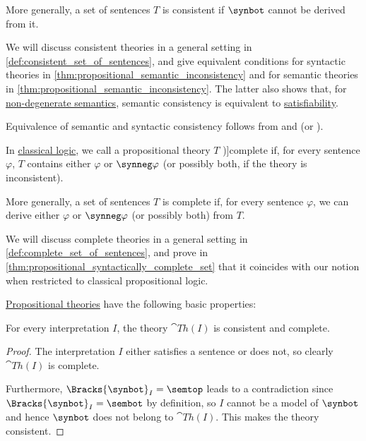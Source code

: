\begin{definition}
\begin{thmenum}
    More generally, a set of sentences \( T \) is consistent if \( \synbot \) cannot be derived from it.

    We will discuss consistent theories in a general setting in \cref{def:consistent_set_of_sentences}, and give equivalent conditions for syntactic theories in \cref{thm:propositional_semantic_inconsistency} and for semantic theories in \cref{thm:propositional_semantic_inconsistency}. The latter also shows that, for \hyperref[def:truth_value_algebra/degenerate]{non-degenerate semantics}, semantic consistency is equivalent to \hyperref[def:propositional_semantics/satisfaction]{satisfiability}.

    Equivalence of semantic and syntactic consistency follows from  and  (or ).

     In \hyperref[con:classical_logic]{classical logic}, we call a propositional theory \( T \) \term[ru=полное (множество формул) (\cite[def. 1.3.16]{Герасимов2014Вычислимость})]{complete} if, for every sentence \( \varphi \), \( T \) contains either \( \varphi \) or \( \synneg \varphi \) (or possibly both, if the theory is inconsistent).

    More generally, a set of sentences \( T \) is complete if, for every sentence \( \varphi \), we can derive either \( \varphi \) or \( \synneg \varphi \) (or possibly both) from \( T \).

    We will discuss complete theories in a general setting in \cref{def:complete_set_of_sentences}, and prove in \cref{thm:propositional_syntactically_complete_set} that it coincides with our notion when restricted to classical propositional logic.
  \end{thmenum}
\end{definition}

\begin{proposition}\label{thm:def:propositional_theory}
  \hyperref[def:propositional_theory]{Propositional theories} have the following basic properties:
  \begin{thmenum}
     For every interpretation \( I \), the theory \( \cat{Th}(I) \) is consistent and complete.
  \end{thmenum}
\end{proposition}
\begin{proof}
   The interpretation \( I \) either satisfies a sentence or does not, so clearly \( \cat{Th}(I) \) is complete.

  Furthermore, \( \Bracks{\synbot}_I = \semtop \) leads to a contradiction since \( \Bracks{\synbot}_I = \sembot \) by definition, so \( I \) cannot be a model of \( \synbot \) and hence \( \synbot \) does not belong to \( \cat{Th}(I) \). This makes the theory consistent.
\end{proof}

